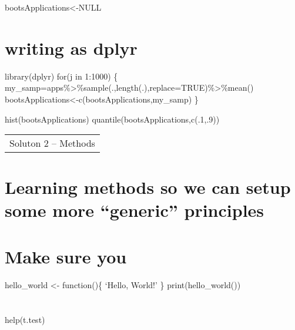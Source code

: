 \documentclass[
]{article}
\begin{document}
bootsApplications\textless-NULL

\section{writing as dplyr}\label{writing-as-dplyr}

library(dplyr) for(j in 1:1000) \{
my\_samp=apps\%\textgreater\%sample(.,length(.),replace=TRUE)\%\textgreater\%mean()
bootsApplications\textless-c(bootsApplications,my\_samp) \}

hist(bootsApplications) quantile(bootsApplications,c(.1,.9))

\begin{longtable}[]{@{}l@{}}
\toprule\noalign{}
\endhead
\bottomrule\noalign{}
\endlastfoot
Soluton 2 -- Methods \\
\end{longtable}

\section{Learning methods so we can setup some more ``generic''
principles}\label{learning-methods-so-we-can-setup-some-more-generic-principles}

\section{Make sure you}\label{make-sure-you}

hello\_world \textless- function()\{ `Hello, World!' \}
print(hello\_world())

\section{}\label{section}

help(t.test)
\end{document}
